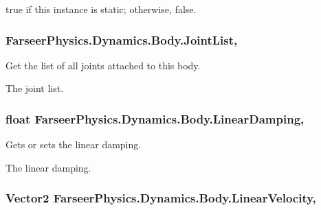 {\ttfamily true} if this instance is static; otherwise, {\ttfamily false}.\hypertarget{class_farseer_physics_1_1_dynamics_1_1_body_a21c76880b4afe8e795ab7d44e57c8d0c}{
\subsubsection[{Joint\+List}]{ Farseer\+Physics.\+Dynamics.\+Body.\+Joint\+List\hspace{0.3cm}{\ttfamily [get]}, {\ttfamily [set]}}}\label{class_farseer_physics_1_1_dynamics_1_1_body_a21c76880b4afe8e795ab7d44e57c8d0c}


Get the list of all joints attached to this body. 

The joint list.\hypertarget{class_farseer_physics_1_1_dynamics_1_1_body_a32e1145d78bc3052db01ed242e35f300}{
\subsubsection[{Linear\+Damping}]{\setlength{\rightskip}{0pt plus 5cm}float Farseer\+Physics.\+Dynamics.\+Body.\+Linear\+Damping\hspace{0.3cm}{\ttfamily [get]}, {\ttfamily [set]}}}\label{class_farseer_physics_1_1_dynamics_1_1_body_a32e1145d78bc3052db01ed242e35f300}


Gets or sets the linear damping. 

The linear damping.\hypertarget{class_farseer_physics_1_1_dynamics_1_1_body_ae0e95db409732f0aeac69a32495226b7}{
\subsubsection[{Linear\+Velocity}]{\setlength{\rightskip}{0pt plus 5cm}Vector2 Farseer\+Physics.\+Dynamics.\+Body.\+Linear\+Velocity\hspace{0.3cm}{\ttfamily [get]}, {\ttfamily [set]}}}\label{class_farseer_physics_1_1_dynamics_1_1_body_ae0e95db409732f0aeac69a32495226b7}


